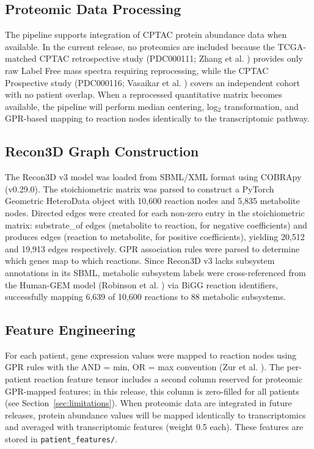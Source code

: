 \documentclass[12pt,a4paper]{article}
\begin{document}
\subsection{Proteomic Data Processing}

The pipeline supports integration of CPTAC protein abundance data when available. In the current release, no proteomics are included because the TCGA-matched CPTAC retrospective study (PDC000111; Zhang et al. \cite{Zhang2014}) provides only raw Label Free mass spectra requiring reprocessing, while the CPTAC Prospective study (PDC000116; Vasaikar et al. \cite{Vasaikar2019}) covers an independent cohort with no patient overlap. When a reprocessed quantitative matrix becomes available, the pipeline will perform median centering, log$_2$ transformation, and GPR-based mapping to reaction nodes identically to the transcriptomic pathway.

\subsection{Recon3D Graph Construction}

The Recon3D v3 model \cite{Brunk2018} was loaded from SBML/XML format using COBRApy (v0.29.0). The stoichiometric matrix was parsed to construct a PyTorch Geometric HeteroData object with 10,600 reaction nodes and 5,835 metabolite nodes. Directed edges were created for each non-zero entry in the stoichiometric matrix: substrate\_of edges (metabolite to reaction, for negative coefficients) and produces edges (reaction to metabolite, for positive coefficients), yielding 20,512 and 19,913 edges respectively. GPR association rules were parsed to determine which genes map to which reactions. Since Recon3D v3 lacks subsystem annotations in its SBML, metabolic subsystem labels were cross-referenced from the Human-GEM model (Robinson et al. \cite{Robinson2020}) via BiGG reaction identifiers, successfully mapping 6,639 of 10,600 reactions to 88 metabolic subsystems.

\subsection{Feature Engineering}

For each patient, gene expression values were mapped to reaction nodes using GPR rules with the AND = min, OR = max convention (Zur et al. \cite{Zur2010}). The per-patient reaction feature tensor includes a second column reserved for proteomic GPR-mapped features; in this release, this column is zero-filled for all patients (see Section~\ref{sec:limitations}). When proteomic data are integrated in future releases, protein abundance values will be mapped identically to transcriptomics and averaged with transcriptomic features (weight 0.5 each). These features are stored in \texttt{patient\_features/}.
\end{document}
